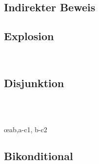 \begin{multicols}{2}
\begin{fitchproof}
\open
\close
{}

\\ 
\end{fitchproof}

\subsection*{Indirekter Beweis}

\begin{fitchproof}
\open
\close
{}
\end{fitchproof}


\subsection*{Explosion}

\begin{fitchproof}
\\
\end{fitchproof}

\subsection*{Disjunktion}

\begin{fitchproof}

\\	

\\	\open
	\close
	\open
	\close
	 \oe{ab,a-c1, b-c2}
\end{fitchproof}

\subsection*{Bikonditional}

\begin{fitchproof}
	\open
	\close
	\open
	\close

\\	
	 

\\	
	 
\end{fitchproof}

\end{multicols}

